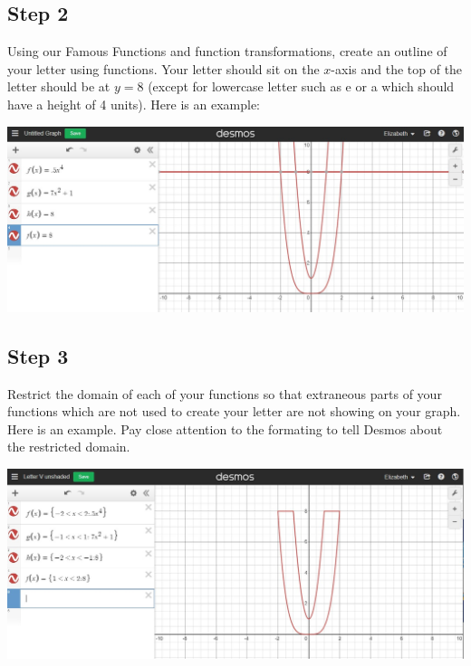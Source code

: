 \documentclass{ximera}
\begin{document}
\subsection{Step 2} Using our Famous Functions and function transformations, create an outline of your letter using functions.  Your letter should sit on the $x$-axis and the top of the letter should be at $y=8$ (except for lowercase letter such as e or a which should have a height of 4 units).  Here is an example:

\begin{image}
\includegraphics[width=\textwidth]{outlinedLetterV.jpg}
\end{image}

\subsection{Step 3} Restrict the domain of each of your functions so that extraneous parts of your functions which are not used to create your letter are not showing on your graph. Here is an example.  Pay close attention to the formating to tell Desmos about the restricted domain. 

\begin{center}  
\end{center} 

\begin{image}
\includegraphics[width=\textwidth]{unshadedLetterV.jpg}
\end{image}
\end{document}
